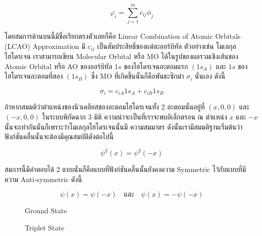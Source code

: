 \begin{equation}
  \label{eq:LCAO}
  \varphi_i = \sum_{j=1}^m c_{i j} \phi_j
\end{equation}

\noindent โดยสมการด้านบนนี้มีชื่อเรียกตรงตัวเลยก็คือ Linear Combination of Atomic Orbitals (LCAO) Approximation
มี $c_{i j}$ เป็นสัมประสิทธิ์ของแต่ละออร์บิทัล ตัวอย่างเช่น โมเลกุลไฮโดรเจน  เราสามารถเขียน Molecular Orbital หรือ MO
ได้ในรูปของผลรวมเชิงเส้นของ Atomic Orbital หรือ AO ของออร์บิทัล $1 s$ ของไฮโดรเจนอะตอมแรก $(1 s_A)$ และ $1 s$
ของไฮโดรเจนอะตอมที่สอง $(1 s_B)$ ซึ่ง MO ที่เกิดขึ้นนั้นก็คือพันธะซิกม่า $\sigma_i$ นั่นเอง ดังนี้

\begin{equation}
  \sigma_i = c_{i A} 1 s_A+c_{i B} 1 s_B
\end{equation}

ถ้าหากสมมติว่าตำแหน่งของนิวเคลียสของอะตอมไฮโดรเจนทั้ง 2 อะตอมนั้นอยู่ที่ $\left(x, 0,0\right)$ และ $\left(-x, 0,0\right)$
ในระบบพิกัดฉาก 3 มิติ ความน่าจะเป็นที่เราจะพบอิเล็กตรอน ณ ตำแหน่ง $x$ และ $-x$ นั้นจะเท่ากันนั่นก็เพราะว่าโมเลกุลไฮโดรเจนนั้นมี%
ความสมมาตร ดังนั้นเรามีสมมติฐานเริ่มต้นว่าฟังก์ชันคลื่นนั้นจะต้องมีคุณสมบัติดังต่อไปนี้

\begin{equation}
  \psi^2(x) = \psi^2(-x)
\end{equation}

\noindent สมการนี้มีคำตอบได้ 2 แบบนั่นก็คือแบบที่ฟังก์ชันคลื่นนั้นยังคงความ Symmetric ไว้กับแบบที่มีความ Anti-symmetric ดังนี้

\begin{equation}
  \psi(x) = \psi(-x)
  \quad \text{และ} \quad
  \psi(x) = -\psi(-x)
\end{equation}

\begin{figure}[htbp]
  \label{fig:MO_H2_ground}
  \centering
  \begin{MOdiagram}[names,style=square]
  \end{MOdiagram}
  \caption{Ground State}
\end{figure}

\begin{figure}[htbp]
  \label{fig:MO_H2_triplet}
  \centering
  \begin{MOdiagram}[names,style=square]
  \end{MOdiagram}
  \caption{Triplet State}
\end{figure}

